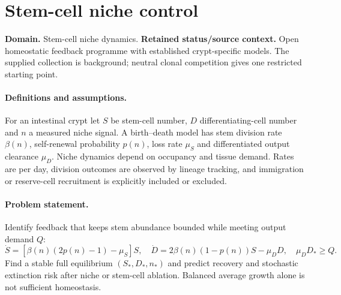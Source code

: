 \documentclass[11pt]{article}
\begin{document}
\section*{Stem-cell niche control}
\label{prob:137}
\label{rank:146}
\par\smallskip

\noindent\textbf{Domain.} Stem-cell niche dynamics. \quad \textbf{Retained status/source context.} Open homeostatic feedback programme with established crypt-specific models. The supplied collection is background; neutral clonal competition gives one restricted starting point.
\paragraph{Definitions and assumptions.} For an intestinal crypt let $S$ be stem-cell number, $D$ differentiating-cell number and $n$ a measured niche signal. A birth--death model has stem division rate $\beta(n)$, self-renewal probability $p(n)$, loss rate $\mu_S$ and differentiated output clearance $\mu_D$. Niche dynamics depend on occupancy and tissue demand. Rates are per day, division outcomes are observed by lineage tracking, and immigration or reserve-cell recruitment is explicitly included or excluded.
\paragraph{Problem statement.} Identify feedback that keeps stem abundance bounded while meeting output demand $Q$:
\[
\dot S=[\beta(n)(2p(n)-1)-\mu_S]S,\quad
\dot D=2\beta(n)(1-p(n))S-\mu_DD,
\quad\mu_DD_*\geq Q.
\]
Find a stable full equilibrium $(S_*,D_*,n_*)$ and predict recovery and stochastic extinction risk after niche or stem-cell ablation. Balanced average growth alone is not sufficient homeostasis.
\end{document}
